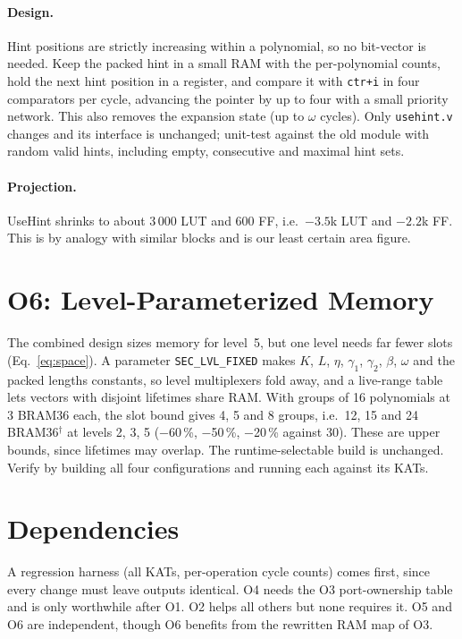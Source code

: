 \documentclass[12pt,a4paper]{report}
\newcommand{\code}[1]{\texttt{#1}}
\begin{document}
\paragraph{Design.}
Hint positions are strictly increasing within a polynomial, so no bit-vector is needed. Keep the packed hint in a small RAM with the per-polynomial counts, hold the next hint position in a register, and compare it with \code{ctr+i} in four comparators per cycle, advancing the pointer by up to four with a small priority network. This also removes the expansion state (up to $\omega$ cycles). Only \code{usehint.v} changes and its interface is unchanged; unit-test against the old module with random valid hints, including empty, consecutive and maximal hint sets.

\paragraph{Projection.}
UseHint shrinks to about 3\,000 LUT and 600 FF, i.e.\ $-3.5$k LUT and $-2.2$k FF. This is by analogy with similar blocks and is our least certain area figure.

\section{O6: Level-Parameterized Memory}
The combined design sizes memory for level~5, but one level needs far fewer slots (Eq.~\eqref{eq:space}). A parameter \code{SEC\_LVL\_FIXED} makes $K$, $L$, $\eta$, $\gamma_1$, $\gamma_2$, $\beta$, $\omega$ and the packed lengths constants, so level multiplexers fold away, and a live-range table lets vectors with disjoint lifetimes share RAM. With groups of 16 polynomials at 3 BRAM36 each, the slot bound gives 4, 5 and 8 groups, i.e.\ 12, 15 and 24 BRAM36$^\dagger$ at levels 2, 3, 5 ($-$60\,\%, $-$50\,\%, $-$20\,\% against 30). These are upper bounds, since lifetimes may overlap. The runtime-selectable build is unchanged. Verify by building all four configurations and running each against its KATs.


\section{Dependencies}
A regression harness (all KATs, per-operation cycle counts) comes first, since every change must leave outputs identical. O4 needs the O3 port-ownership table and is only worthwhile after O1. O2 helps all others but none requires it. O5 and O6 are independent, though O6 benefits from the rewritten RAM map of O3.
\end{document}
